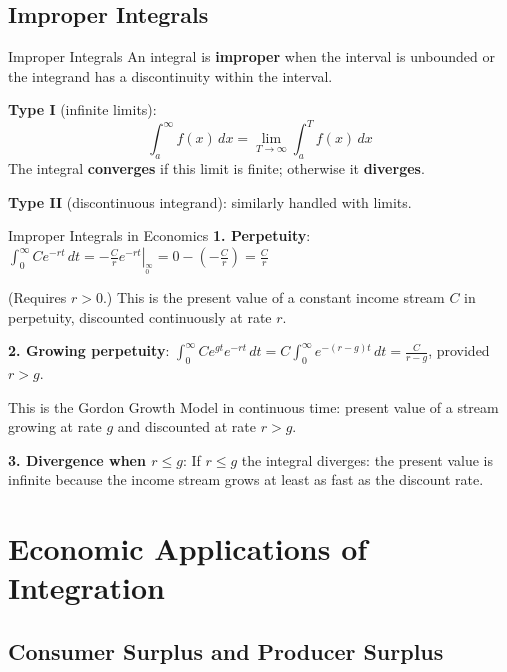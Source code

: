 \documentclass[12pt, a4paper]{article}
\theoremstyle{definition}
\newcommand{\dd}[1]{\,d#1}
\newcommand{\eval}[2]{\left.#1\right|_{#2}}
\begin{document}
\subsection{Improper Integrals}

\begin{defbox}{Improper Integrals}
An integral is \textbf{improper} when the interval is unbounded or the
integrand has a discontinuity within the interval.

\textbf{Type I} (infinite limits):
\[
  \int_a^{\infty} f(x)\dd{x}
  = \lim_{T\to\infty}\int_a^T f(x)\dd{x}
\]
The integral \textbf{converges} if this limit is finite; otherwise it
\textbf{diverges}.

\textbf{Type II} (discontinuous integrand): similarly handled with limits.
\end{defbox}
\newpage
\begin{exbox}{Improper Integrals in Economics}
\textbf{1. Perpetuity}:
$\displaystyle\int_0^\infty Ce^{-rt}\dd{t}
= \eval{-\frac{C}{r}e^{-rt}}{_0^\infty}
= 0 - \left(-\frac{C}{r}\right)
= \frac{C}{r}$

(Requires $r>0$.) This is the present value of a constant income stream $C$
in perpetuity, discounted continuously at rate $r$.

\textbf{2. Growing perpetuity}:
$\displaystyle\int_0^\infty Ce^{gt}e^{-rt}\dd{t}
= C\int_0^\infty e^{-(r-g)t}\dd{t}
= \frac{C}{r-g}$, provided $r>g$.

This is the Gordon Growth Model in continuous time: present value of a
stream growing at rate $g$ and discounted at rate $r>g$.

\textbf{3. Divergence when $r\leq g$}:
If $r\leq g$ the integral diverges: the present value is infinite because
the income stream grows at least as fast as the discount rate.
\end{exbox}

\section{Economic Applications of Integration}

\subsection{Consumer Surplus and Producer Surplus}
\end{document}
